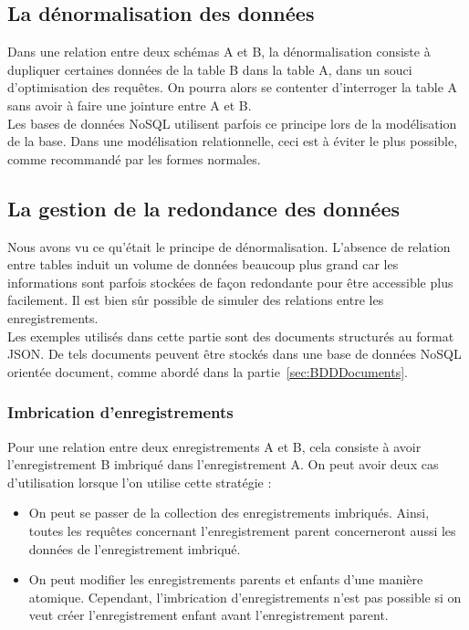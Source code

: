 \subsection{La dénormalisation des données}
	Dans une relation entre deux schémas A et B, la dénormalisation consiste à dupliquer certaines données de la table B dans la table A, dans un souci d'optimisation des requêtes. On pourra alors se contenter d'interroger la table A sans avoir à faire une jointure entre A et B.\\

	Les bases de données NoSQL utilisent parfois ce principe lors de la modélisation de la base. Dans une modélisation relationnelle, ceci est à éviter le plus possible, comme recommandé par les formes normales.

\subsection{La gestion de la redondance des données}
	Nous avons vu ce qu'était le principe de dénormalisation. L'absence de relation entre tables induit un volume de données beaucoup plus grand car les informations sont parfois stockées de façon redondante pour être accessible plus facilement. Il est bien sûr possible de simuler des relations entre les enregistrements.\\

	Les exemples utilisés dans cette partie sont des documents structurés au format JSON. De tels documents peuvent être stockés dans une base de données NoSQL orientée document, comme abordé dans la partie~\ref{sec:BDDDocuments}.

	\subsubsection{Imbrication d'enregistrements}
		Pour une relation entre deux enregistrements A et B, cela consiste à avoir l'enregistrement B imbriqué dans l'enregistrement A. On peut avoir deux cas d'utilisation lorsque l'on utilise cette stratégie :

		\begin{itemize}
			\item On peut se passer de la collection des enregistrements imbriqués. Ainsi, toutes les requêtes concernant l'enregistrement parent concerneront aussi les données de l'enregistrement imbriqué.
			\item On peut modifier les enregistrements parents et enfants d'une manière atomique. Cependant, l'imbrication d'enregistrements n'est pas possible si on veut créer l'enregistrement enfant avant l'enregistrement parent.
		\end{itemize}
		\vspace{20px}

